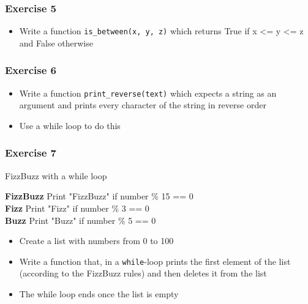\documentclass[10pt, a4paper]{beamer} %
\begin{document}
{\begin{frame}[c, fragile]
\end{frame}

\begin{frame}[c, fragile]\frametitle{Exercise 5}
\begin{itemize}
    \item Write a function \texttt{is\_between(x, y, z)} which returns True if x <= y <=
z and False otherwise
\end{itemize}
    
\end{frame}

    

\begin{frame}[c, fragile]\frametitle{Exercise 6}
    
\begin{itemize}
    \item Write a function \texttt{print\_reverse(text)} which expects a string as an argument and prints every character of the string in reverse order
    \item Use a while loop to do this
\end{itemize}
\end{frame}

\begin{frame}[c, fragile]\frametitle{Exercise 7}
FizzBuzz with a while loop

\textbf{FizzBuzz} Print "FizzBuzz" if number \% 15 == 0\\
\textbf{Fizz} Print "Fizz" if number \% 3 == 0\\
\textbf{Buzz} Print "Buzz" if number \% 5 == 0

\begin{itemize}
    \item Create a list with numbers from 0 to 100
    \item Write a function that, in a \texttt{while}-loop prints the first element of the list (according to the FizzBuzz rules) and then deletes it from the list
    \item The while loop ends once the list is empty
\end{itemize}
\end{frame}


}
\end{document}
